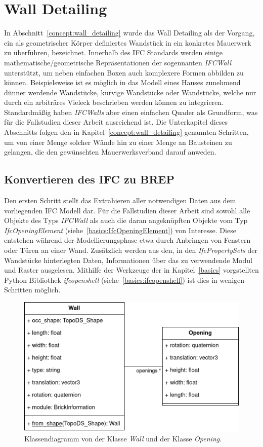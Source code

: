\section{Wall Detailing}
In Abschnitt~\ref{concept:wall_detailing} wurde das Wall Detailing als der Vorgang, ein als geometrischer Körper definiertes Wandstück in ein konkretes Mauerwerk zu überführen, bezeichnet.
Innerhalb des IFC Standards werden einige mathematische/geometrische Repräsentationen der sogennanten \textit{IFCWall} unterstützt, um neben einfachen Boxen auch komplexere Formen abbilden zu können.
Beispielsweise ist es möglich in das Modell eines Hauses zunehmend dünner werdende Wandstücke, kurvige Wandstücke oder Wandstücke, welche nur durch ein arbiträres Vieleck beschrieben werden können zu integrieren.
Standardmäßig haben \textit{IFCWalls} aber einen einfachen Quader als Grundform, was für die Fallstudien dieser Arbeit ausreichend ist.
Die Unterkapitel dieses Abschnitts folgen den in Kapitel~\ref{concept:wall_detailing} genannten Schritten, um von einer Menge solcher Wände hin zu einer Menge an Bausteinen zu gelangen, die den gewünschten Mauerwerksverband darauf anweden.

\subsection{Konvertieren des IFC zu BREP}
Den ersten Schritt stellt das Extrahieren aller notwendigen Daten aus dem vorliegenden IFC Modell dar.
Für die Fallstudien dieser Arbeit sind sowohl alle Objekte des Typs \textit{IFCWall} als auch die daran angeknüpften Objekte vom Typ \textit{IfcOpeningElement} (siehe~\ref{basics:IfcOpeningElement}) von Interesse.
Diese entstehen während der Modellierungsphase etwa durch Anbringen von Fenstern oder Türen an einer Wand.
Zusätzlich werden aus den, in den \textit{IfcPropertySets} der Wandstücke hinterlegten Daten, Informationen über das zu verwendende Modul und Raster ausgelesen.
Mithilfe der Werkzeuge der in Kapitel~\ref{basics} vorgstellten Python Bibliothek \textit{ifcopenshell} (siehe~\ref{basics:ifcopenshell}) ist dies in wenigen Schritten möglich.
\begin{figure}[htb]
  \centering
  \includegraphics[width=0.8\columnwidth]{fig/klassendiagramm_ifc_to_wall.drawio.png}
  \caption{Klassendiagramm von der Klasse \textit{Wall} und der Klasse \textit{Opening}.}
  \label{fig:real:ifc_to_wall}
\end{figure}

